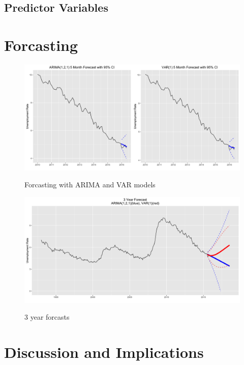 \documentclass[twoside,twocolumn]{article}
\begin{document}
\subsection{Predictor Variables}

\blindtext %

\section{Forcasting}

 \begin{figure}[H]
    	\centering
     	\caption{Forcasting with ARIMA and VAR models}
     	\includegraphics[width=\linewidth]{images/forcasts}
     	\label{fig:forcasts}
      \end{figure}
      
       \begin{figure}[H]
    	\centering
     	\caption{3 year forcasts}
     	\includegraphics[width=\linewidth]{images/forcast3}
     	\label{fig:forcasts2}
      \end{figure}

\section{Discussion and Implications}
\end{document}
